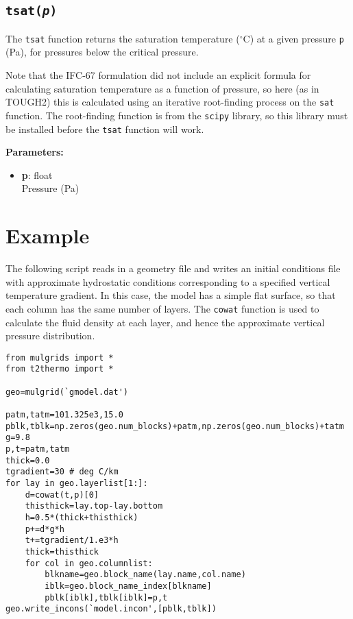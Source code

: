 \subsection{\texttt{tsat(\emph{p})}}

The \texttt{tsat} function returns the saturation temperature ($^{\circ}$C) at a given pressure \texttt{p} (Pa), for pressures below the critical pressure.

Note that the IFC-67 formulation did not include an explicit formula for calculating saturation temperature as a function of pressure, so here (as in TOUGH2) this is calculated using an iterative root-finding process on the \texttt{sat} function.  The root-finding function is from the \texttt{scipy} library, so this library must be installed before the \texttt{tsat} function will work.

\textbf{Parameters:}
\begin{itemize}
\item \textbf{p}: float\\
  Pressure (Pa)
\end{itemize}

\section{Example}

The following script reads in a geometry file and writes an initial conditions file with approximate hydrostatic conditions corresponding to a specified vertical temperature gradient.  In this case, the model has a simple flat surface, so that each column has the same number of layers.  The \texttt{cowat} function is used to calculate the fluid density at each layer, and hence the approximate vertical pressure distribution.

\begin{verbatim}
from mulgrids import *
from t2thermo import *

geo=mulgrid(`gmodel.dat')

patm,tatm=101.325e3,15.0
pblk,tblk=np.zeros(geo.num_blocks)+patm,np.zeros(geo.num_blocks)+tatm
g=9.8
p,t=patm,tatm
thick=0.0
tgradient=30 # deg C/km
for lay in geo.layerlist[1:]:
    d=cowat(t,p)[0]
    thisthick=lay.top-lay.bottom
    h=0.5*(thick+thisthick)
    p+=d*g*h
    t+=tgradient/1.e3*h
    thick=thisthick
    for col in geo.columnlist:
        blkname=geo.block_name(lay.name,col.name)
        iblk=geo.block_name_index[blkname]
        pblk[iblk],tblk[iblk]=p,t
geo.write_incons(`model.incon',[pblk,tblk])
\end{verbatim}
